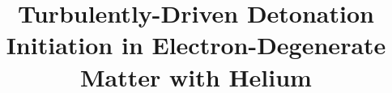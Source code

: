 \documentclass{aastex63}
\begin{document}
\title{Turbulently-Driven Detonation Initiation in Electron-Degenerate Matter with Helium}


\end{document}
